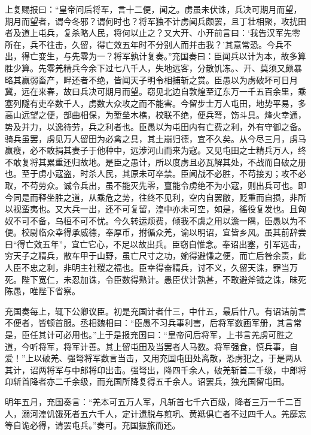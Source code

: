 \documentclass[12pt,UTF8]{ctexbook}
\begin{document}
上复赐报曰：“皇帝问后将军，言十二便，闻之。虏虽未伏诛，兵决可期月而望，期月而望者，谓今冬邪？谓何时也？将军独不计虏闻兵颇罢，且丁壮相聚，攻扰田者及道上屯兵，复杀略人民，将何以止之？又大开、小开前言曰：‘我告汉军先零所在，兵不往击，久留，得亡效五年时不分别人而并击我？’其意常恐。今兵不出，得亡变生，与先零为一？将军孰计复奏。”充国奏曰：臣闻兵以计为本，故多算胜少算。先零羌精兵今余下过七八千人，失地远客，分散饥冻。、开、莫须又颇暴略其赢弱畜产，畔还者不绝，皆闻天子明令相捕斩之赏。臣愚以为虏破坏可日月冀，远在来春，故曰兵决可期月而望。窃见北边自敦煌至辽东万一千五百余里，乘塞列隧有吏卒数千人，虏数大众攻之而不能害。今留步士万人屯田，地势平易，多高山远望之便，部曲相保，为堑垒木樵，校联不绝，便兵弩，饬斗具。烽火幸通，势及并力，以逸待劳，兵之利者也。臣愚以为屯田内有亡费之利，外有守御之备。骑兵虽罢，虏见万人留田为必禽之具，其土崩归德，宜不久矣。从今尽三月，虏马赢瘦，必不敢捐其妻子于他种中，远涉河山而来为寇。又见屯田之士精兵万人，终不敢复将其累重还归故地。是臣之愚计，所以度虏且必瓦解其处，不战而自破之册也。至于虏小寇盗，时杀人民，其原未可卒禁。臣闻战不必胜，不苟接刃；攻不必取，不苟劳众。诚令兵出，虽不能灭先零，亶能令虏绝不为小寇，则出兵可也。即今同是而释坐胜之道，从乘危之势，往终不见利，空内自罢敝，贬重而自损，非所以视蛮夷也。又大兵一出，还不可复留，湟中亦未可空，如是，徭役复发也。且匈奴不可不备，乌桓不可不忧。今久转运烦费，倾我不虞之用以澹一隅，臣愚以为不便。校尉临众幸得承威德，奉厚币，拊循众羌，谕以明诏，宜皆乡风。虽其前辞尝曰“得亡效五年”，宜亡它心，不足以故出兵。臣窃自惟念。奉诏出塞，引军远击，穷天子之精兵，散车甲于山野，虽亡尺寸之功，媮得避慊之便，而亡后咎余责，此人臣不忠之利，非明主社稷之福也。臣幸得奋精兵，讨不义，久留天诛，罪当万死。陛下宽仁，未忍加诛，令臣数得熟计。愚臣伏计孰甚，不敢避斧钺之诛，昧死陈愚，唯陛下省察。



充国奏每上，辄下公卿议臣。初是充国计者什三，中什五，最后什八。有诏诘前言不便者，皆顿首服。丞相魏相曰：“臣愚不习兵事利害，后将军数画军册，其言常是，臣任其计可必用也。”上于是报充国曰：“皇帝问后将军，上书言羌虏可胜之道，今听将军，将军计善。其上留屯田及当罢者人马数。将军强食，慎兵事，自爱！”上以破羌、强弩将军数言当击，又用充国屯田处离散，恐虏犯之，于是两从其计，诏两将军与中郎将卬出击。强弩出，降四千余人，破羌斩首二千级，中郎将卬斩首降者亦二千余级，而充国所降复得五千余人。诏罢兵，独充国留屯田。



明年五月，充国奏言：“羌本可五万人军，凡斩首七千六百级，降者三万一千二百人，溺河湟饥饿死者五六千人，定计遗脱与煎巩、黄羝俱亡者不过四千人。羌靡忘等自诡必得，请罢屯兵。”奏可。充国振旅而还。
\end{document}
